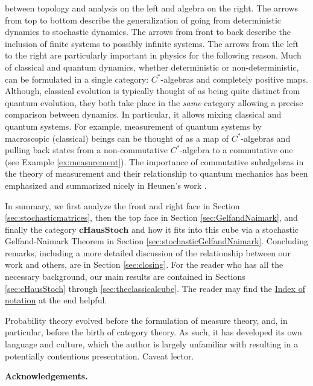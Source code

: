 \documentclass[12pt]{article}
\theoremstyle{theorem}
\theoremstyle{definition}
\numberwithin{equation}{section}
\newcommand{\<}{\langle}
\renewcommand{\>}{\rangle}
\newcommand{\cHStoch}{\mathbf{cHausStoch}}
\begin{document}
between topology and analysis on the left and algebra on the right. 
The arrows from top to bottom describe the generalization of going from
deterministic dynamics to stochastic dynamics. 
The arrows from front to back describe the inclusion of finite systems
to possibly infinite systems. 
The arrows from the left to the right are particularly important in 
physics for the following reason. 
Much of classical and quantum dynamics, whether
deterministic or non-deterministic, can be formulated in a single
category: $C^*$-algebras and completely positive maps.
Although, classical evolution is typically thought of as being quite distinct from quantum
evolution, they both
take place in the \emph{same} category allowing a precise comparison
between dynamics. In particular, it allows mixing classical and quantum systems.
For example, measurement of quantum systems by 
macroscopic (classical) beings can be thought of as a map of $C^*$-algebras
and pulling back states from a non-commutative $C^*$-algebra to a 
commutative one (see Example \ref{ex:measurement}). 
The importance of commutative subalgebras
in the theory of measurement and their relationship to quantum 
mechanics has been emphasized
and summarized nicely in Heunen's work \cite{He17}. 

In summary, we first analyze the front and right face
in Section \ref{sec:stochasticmatrices}, 
then the top face in Section \ref{sec:GelfandNaimark}, 
and finally the 
category
$\cHStoch$ and how it fits into this cube via a stochastic 
Gelfand-Naimark Theorem
in Section \ref{sec:stochasticGelfandNaimark}. 
Concluding remarks, including a more detailed discussion
of the relationship between our work and others, are in Section \ref{sec:closing}. 
For the reader who has all the necessary background, our main results
are contained in Sections \ref{sec:cHausStoch} through 
\ref{sec:theclassicalcube}. The reader may find the 
\hyperref[indexofnotation]{Index of notation} at the end helpful. 

Probability theory evolved before the formulation of measure theory, 
and, in particular, before the birth of category theory. 
As such, it has developed its own language and culture, which
the author is largely unfamiliar with resulting in a 
potentially contentious presentation. Caveat lector. 

\vspace{3mm}
\noindent
\textbf{Acknowledgements.}
\end{document}
